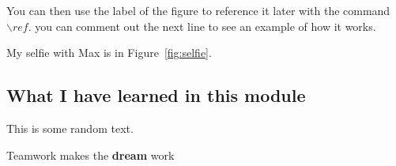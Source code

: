 You can then use the label of the figure to reference it later with the command ${\backslash}ref$. you can comment out the next line to see an example of how it works.

My selfie with Max is in  Figure~\ref{fig:selfie}.

\subsection{What I have learned in this module}
This is some random text.

Teamwork makes the \textbf{dream} work